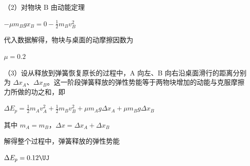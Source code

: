 \documentclass[\gkver]{gaokaozhenti}
\begin{document}
\begin{enumerate}[resume=tiku]
{（2）对物块 B 由动能定理

$-\mu m_{B}gx_{B} = 0 - \frac{1}{2}m_{B}v_{B}^{2}$

代入数据解得，物块与桌面的动摩擦因数为

$\mu = 0.2$

（3）设从释放到弹簧恢复原长的过程中，A 向左、B 向右沿桌面滑行的距离分别为 $\Delta x_{A}$、$\Delta x_{B}$。这一阶段弹簧释放的弹性势能等于两物块增加的动能与克服摩擦力所做的功之和，即

$\Delta E_{p} = \frac{1}{2}m_{A}v_{A}^{2} + \frac{1}{2}m_{B}v_{B}^{2} + \mu m_{A}g\Delta x_{A} + \mu m_{B}g\Delta x_{B}$

其中 $m_{A} = m_{B}$，$\Delta x = \Delta x_{A} + \Delta x_{B}$

解得整个过程中，弹簧释放的弹性势能

$\Delta E_{p} = 0.12 \UJ$
}

\end{enumerate}
\end{document}
